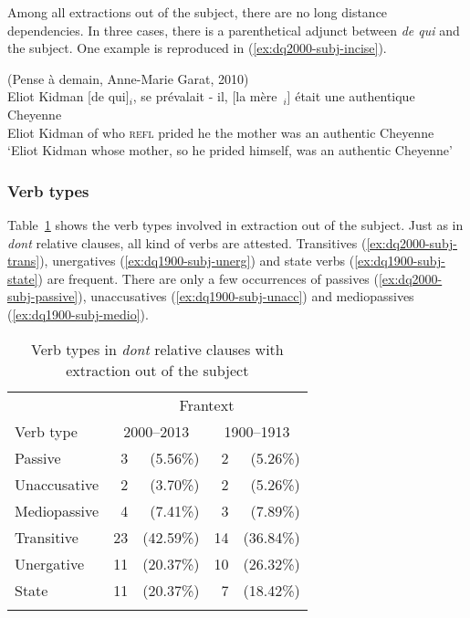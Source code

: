 Among all extractions out of the subject, there are no long distance dependencies. In three cases, there is a parenthetical adjunct between \emph{de qui} and the subject. One example is reproduced in (\ref{ex:dq2000-subj-incise}). 

\ea (Pense à demain, Anne-Marie Garat, 2010)\\
\gll Eliot Kidman	[de qui]$_i$, se prévalait - il, [la mère~\trace{}$_i$] était une authentique Cheyenne\\
Eliot Kidman of who \textsc{refl} prided {} he the mother was an authentic Cheyenne\\
\glt `Eliot Kidman whose mother, so he prided himself, was an authentic Cheyenne'
\label{ex:dq2000-subj-incise}
\z 

\subsubsection{Verb types}

Table~\ref{tab:FTB-verbtype} shows the verb types involved in extraction out of the subject. Just as in \emph{dont} relative clauses, all kind of verbs are attested. Transitives (\ref{ex:dq2000-subj-trans}), unergatives (\ref{ex:dq1900-subj-unerg}) and state verbs (\ref{ex:dq1900-subj-state}) are frequent. There are only a few occurrences of passives (\ref{ex:dq2000-subj-passive}), unaccusatives (\ref{ex:dq1900-subj-unacc}) and mediopassives (\ref{ex:dq1900-subj-medio}).

\begin{table}
    \begin{tabular}{l *2{r@{~}r}}
         \lsptoprule
                      & \multicolumn{4}{c}{Frantext}\\\cmidrule(lr){2-5} 
         Verb type    & \multicolumn{2}{c}{2000--2013} & \multicolumn{2}{c}{1900--1913} \\\midrule
         Passive      & 3  &  (5.56\%) &  2 & (5.26\%) \\
         Unaccusative & 2  &  (3.70\%) &  2 & (5.26\%) \\
         Mediopassive & 4  &  (7.41\%) &  3 & (7.89\%) \\
         Transitive   & 23 & (42.59\%) & 14 & (36.84\%) \\
         Unergative   & 11 & (20.37\%) & 10 & (26.32\%) \\
         State        & 11 & (20.37\%) &  7 & (18.42\%) \\
         \lspbottomrule
    \end{tabular}
    \caption{Verb types in \emph{dont} relative clauses with extraction out of the subject}
    \label{tab:FTB-verbtype}
\end{table}

